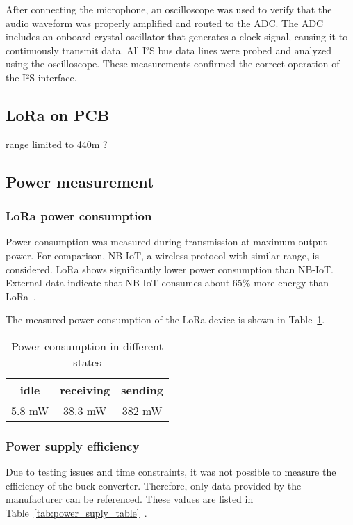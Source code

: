 \documentclass[conference]{IEEEtran}
\begin{document}
After connecting the microphone, an oscilloscope was used to verify that the audio waveform was properly amplified and routed to the ADC.
The ADC includes an onboard crystal oscillator that generates a clock signal, causing it to continuously transmit data.
All I²S bus data lines were probed and analyzed using the oscilloscope.
These measurements confirmed the correct operation of the I²S interface.

\subsection{LoRa on PCB}

range limited to 440m ?

\subsection{Power measurement}

\subsubsection{LoRa power consumption}

Power consumption was measured during transmission at maximum output power.  
For comparison, NB-IoT, a wireless protocol with similar range, is considered.  
LoRa shows significantly lower power consumption than NB-IoT.  
External data indicate that NB-IoT consumes about 65\% more energy than LoRa~\cite{Lora-nbiot_paper}.  

The measured power consumption of the LoRa device is shown in Table~\ref{tab:power_consumption}.

\begin{table}[h]
  \centering
  \caption{Power consumption in different states}
\label{tab:power_consumption}
  \begin{tabular}{|c|c|c|}
    \hline
    \textbf{idle} & \textbf{receiving} & \textbf{sending} \\
    \hline
    5.8 mW & 38.3 mW & 382 mW \\
    \hline
  \end{tabular}
\end{table}

\subsubsection{Power supply efficiency}

Due to testing issues and time constraints, it was not possible to measure the efficiency of the buck converter.
Therefore, only data provided by the manufacturer can be referenced. These values are listed in Table~\ref{tab:power_suply_table}~\cite{TPS629203}.
\end{document}
